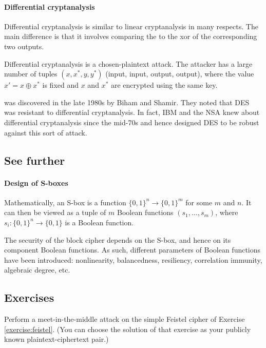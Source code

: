 \documentclass[a4paper, 11pt, openany]{book}
\begin{document}
\paragraph{Differential cryptanalysis}
Differential cryptanalysis is similar to linear cryptanalysis in many respects. The main difference is that it involves comparing the  to the xor of the corresponding two outputs.

Differential cryptanalysis is a chosen-plaintext attack. The attacker has a large number of tuples $(x, x^*, y, y^*)$ (input, input, output, output), where the value $x' = x \oplus x^*$ is fixed and $x$ and $x^*$ are encrypted using the same key.

 was discovered in the late 1980s by Biham and Shamir. They noted that DES was resistant to differential cryptanalysis. In fact, IBM and the NSA knew about differential cryptanalysis since the mid-70s and hence designed DES to be robust against this sort of attack.



\subsection{See further}

\paragraph{Design of S-boxes}
Mathematically, an S-box is a function $\{0,1\}^n \to \{0,1\}^m$ for some $m$ and $n$. It can then be viewed as a tuple of $m$ Boolean functions $(s_1, \dots, s_m)$, where $s_i : \{0,1\}^n \to \{0,1\}$ is a Boolean function.

The security of the block cipher depends on the S-box, and hence on its component Boolean functions. As such, different parameters of Boolean functions have been introduced: nonlinearity, balancedness, resiliency, correlation immunity, algebraic degree, etc.





\subsection{Exercises}

\begin{exercise}
Perform a meet-in-the-middle attack on the simple Feistel cipher of Exercise \ref{exercise:feistel}. (You can choose the solution of that exercise as your publicly known plaintext-ciphertext pair.)
\end{exercise}
\end{document}
